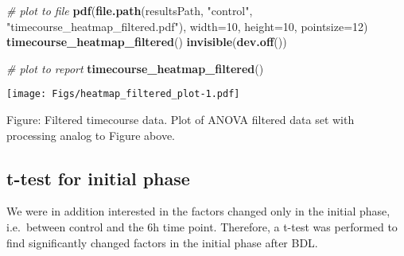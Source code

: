 \documentclass[]{article}
\newenvironment{Shaded}{\begin{snugshade}}{\end{snugshade}}
\newcommand{\KeywordTok}[1]{\textcolor[rgb]{0.13,0.29,0.53}{\textbf{{#1}}}}
\newcommand{\DataTypeTok}[1]{\textcolor[rgb]{0.13,0.29,0.53}{{#1}}}
\newcommand{\DecValTok}[1]{\textcolor[rgb]{0.00,0.00,0.81}{{#1}}}
\newcommand{\StringTok}[1]{\textcolor[rgb]{0.31,0.60,0.02}{{#1}}}
\newcommand{\CommentTok}[1]{\textcolor[rgb]{0.56,0.35,0.01}{\textit{{#1}}}}
\newcommand{\NormalTok}[1]{{#1}}
\begin{document}
\begin{Shaded}
\begin{Highlighting}[]
\CommentTok{# plot to file}
\KeywordTok{pdf}\NormalTok{(}\KeywordTok{file.path}\NormalTok{(resultsPath, }\StringTok{"control"}\NormalTok{, }\StringTok{"timecourse_heatmap_filtered.pdf"}\NormalTok{), }
    \DataTypeTok{width=}\DecValTok{10}\NormalTok{, }\DataTypeTok{height=}\DecValTok{10}\NormalTok{, }\DataTypeTok{pointsize=}\DecValTok{12}\NormalTok{)  }
\KeywordTok{timecourse_heatmap_filtered}\NormalTok{()}
\KeywordTok{invisible}\NormalTok{(}\KeywordTok{dev.off}\NormalTok{())}
\end{Highlighting}
\end{Shaded}

\begin{Shaded}
\begin{Highlighting}[]
\CommentTok{# plot to report}
\KeywordTok{timecourse_heatmap_filtered}\NormalTok{()}
\end{Highlighting}
\end{Shaded}

\texttt{[image: Figs/heatmap\_filtered\_plot-1.pdf]}

Figure: Filtered timecourse data. Plot of ANOVA filtered data set with
processing analog to Figure above.

\subsection{t-test for initial phase}\label{t-test-for-initial-phase}

We were in addition interested in the factors changed only in the
initial phase, i.e.~between control and the 6h time point. Therefore, a
t-test was performed to find significantly changed factors in the
initial phase after BDL.
\end{document}

